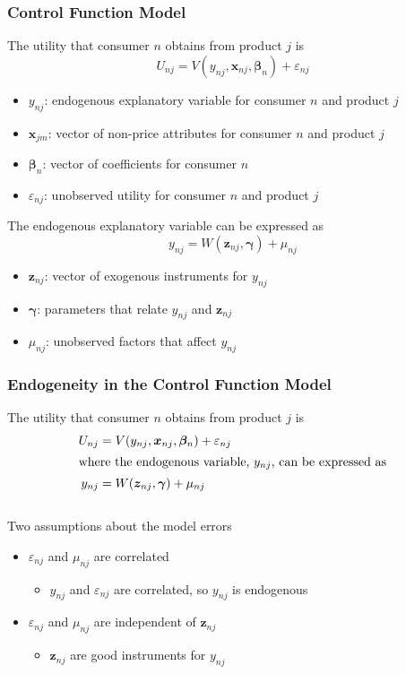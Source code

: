 \documentclass{beamer}
\begin{document}
\begin{frame}\frametitle{Control Function Model}
    The utility that consumer $n$ obtains from product $j$ is
    $$U_{nj} = V(y_{nj}, \bm{x}_{nj}, \bm{\beta}_n) + \varepsilon_{nj}$$
    \vspace{-3ex}
    \begin{itemize}
        \item $y_{nj}$: endogenous explanatory variable for consumer $n$ and product $j$
        \item $\bm{x}_{jm}$: vector of non-price attributes for consumer $n$ and product $j$
        \item $\bm{\beta}_n$: vector of coefficients for consumer $n$
        \item $\varepsilon_{nj}$: unobserved utility for consumer $n$ and product $j$
    \end{itemize}
    \vspace{2ex}
    The endogenous explanatory variable can be expressed as
    $$y_{nj} = W(\bm{z}_{nj}, \bm{\gamma}) + \mu_{nj}$$
    \vspace{-3ex}
    \begin{itemize}
        \item $\bm{z}_{nj}$: vector of exogenous instruments for $y_{nj}$
        \item $\bm{\gamma}$: parameters that relate $y_{nj}$ and $\bm{z}_{nj}$
        \item $\mu_{nj}$: unobserved factors that affect $y_{nj}$
    \end{itemize}
\end{frame}

\begin{frame}\frametitle{Endogeneity in the Control Function Model}
    The utility that consumer $n$ obtains from product $j$ is
    \begin{align*}
        U_{nj} & = V(y_{nj}, \bm{x}_{nj}, \bm{\beta}_n) + \varepsilon_{nj} \\
        \intertext{where the endogenous variable, $y_{nj}$, can be expressed as}
        y_{nj} & = W(\bm{z}_{nj}, \bm{\gamma}) + \mu_{nj}
    \end{align*} \\
    \vspace{3ex}
    Two assumptions about the model errors
    \begin{itemize}
        \item $\varepsilon_{nj}$ and $\mu_{nj}$ are correlated
        \begin{itemize}
            \item $y_{nj}$ and $\varepsilon_{nj}$ are correlated, so $y_{nj}$ is endogenous
        \end{itemize}
        \item $\varepsilon_{nj}$ and $\mu_{nj}$ are independent of $\bm{z}_{nj}$
        \begin{itemize}
            \item $\bm{z}_{nj}$ are good instruments for $y_{nj}$
        \end{itemize}
    \end{itemize}
\end{frame}
\end{document}
